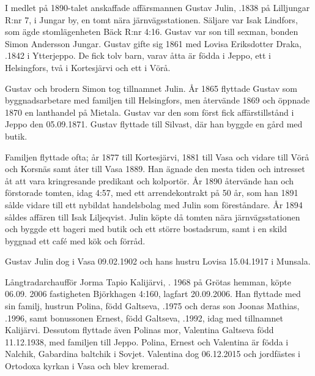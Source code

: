 I medlet på 1890-talet anskaffade affärsmannen Gustav Julin, .1838 på Lilljungar R:nr 7, i Jungar by, en tomt nära järnvägsstationen. Säljare var Isak Lindfors, som ägde stomlägenheten Bäck R:nr 4:16. Gustav var son till sexman, bonden Simon Andersson Jungar. Gustav gifte sig 1861 med Lovisa Eriksdotter Draka, .1842 i Ytterjeppo. De fick tolv barn, varav åtta är födda i Jeppo, ett i Helsingfors, två i Kortesjärvi och ett i Vörå.

Gustav och brodern Simon tog tillnamnet Julin. År 1865 flyttade Gustav som byggnadsarbetare med familjen till Helsingfors, men återvände 1869 och öppnade 1870 en lanthandel på Mietala. Gustav var den som först fick affärstillstånd i Jeppo den 05.09.1871. Gustav flyttade till Silvast, där han byggde en gård med butik.

Familjen flyttade ofta; år 1877 till Kortesjärvi, 1881 till Vasa och vidare till Vörå och Korsnäs samt åter till Vasa 1889. Han ägnade den mesta tiden och intresset åt att vara kringresande predikant	och kolportör. År 1890 återvände han och förstorade tomten, idag 4:57,	med ett arrendekontrakt på 50 år, som han 1891 sålde vidare till ett nybildat handelsbolag med Julin som föreståndare. År 1894 såldes affären till Isak Liljeqvist. Julin köpte då tomten nära järnvägsstationen och byggde ett bageri med butik och ett större bostadsrum, samt i en skild byggnad ett café med kök och förråd.

Gustav Julin dog i Vasa 09.02.1902 och hans hustru Lovisa 15.04.1917 i Munsala.






Långtradarchaufför Jorma Tapio Kalijärvi, . 1968 på Grötas hemman, köpte 06.09. 2006 fastigheten Björkhagen 4:160, lagfart 20.09.2006. Han flyttade med sin familj, hustrun Polina, född Galtseva, .1975 och deras son Joonas Mathias, .1996, samt bonussonen Ernest, född Galtseva, .1992, idag med tillnamnet Kalijärvi. Dessutom flyttade även Polinas mor, Valentina Galtseva  född 11.12.1938, med familjen till Jeppo. Polina, Ernest och Valentina är födda i Nalchik, Gabardina baltchik i Sovjet. Valentina dog 06.12.2015 och jordfästes i Ortodoxa kyrkan i Vasa och blev kremerad.

